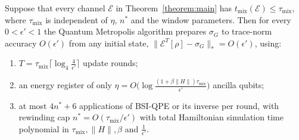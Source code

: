 \begin{corollary}
\label{corollary:polycost}
Suppose that every channel $\mathcal{E}$ in Theorem~\ref{theorem:main} has $t_{\mathrm{mix}}(\mathcal{E})\leq\tau_{\mathrm{mix}}$, where $\tau_{\mathrm{mix}}$ is independent of $\eta$, $n^*$ and the window parameters. Then for every $0<\epsilon'<1$ the Quantum Metropolis algorithm prepares $\sigma_G$ to trace-norm accuracy $O(\epsilon')$ from any initial state, $\|\mathcal{E}^T[\rho]-\sigma_G\|_*=O(\epsilon')$, using:
\begin{enumerate}
    \item[(i)] $T=\tau_{\mathrm{mix}}\big\lceil\log_4\frac{4}{\epsilon'}\big\rceil$ update rounds;
    \item[(ii)] an energy register of only $\eta=O\big(\log\frac{(1+\beta\|H\|)\tau_{\mathrm{mix}}}{\epsilon'}\big)$ ancilla qubits;
    \item[(iii)] at most $4n^*+6$ applications of BSI-QPE or its inverse per round, with rewinding cap $n^*=O(\tau_{\mathrm{mix}}/\epsilon')$ with total Hamiltonian simulation time polynomial in $\tau_{\mathrm{mix}}, \|H\|, \beta$ and  $\frac{1}{\epsilon'}$.
\end{enumerate}
\end{corollary}
